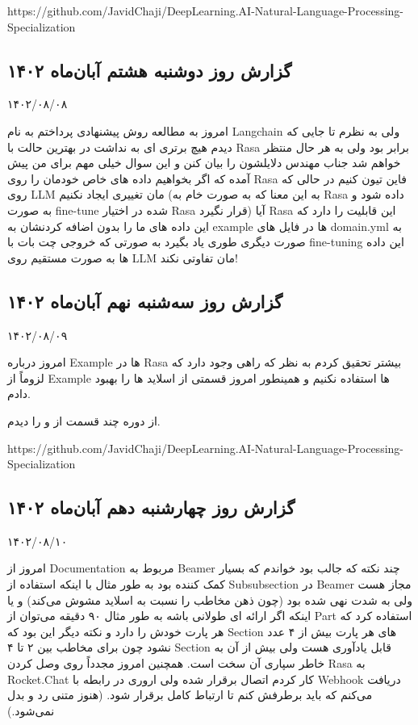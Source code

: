 https://github.com/JavidChaji/DeepLearning.AI-Natural-Language-Processing-Specialization


\subsection{گزارش روز دوشنبه هشتم آبان‌ماه ۱۴۰۲}

۱۴۰۲/۰۸/۰۸

امروز به مطالعه روش پیشنهادی پرداختم به نام Langchain ولی به نظرم تا جایی که دیدم هیچ برتری ای به   نداشت در بهترین حالت با Rasa برابر بود ولی به هر حال منتظر خواهم شد جناب مهندس دلایلشون را بیان کنن و این سوال خیلی مهم برای من پیش آمده که اگر بخواهیم داده های خاص خودمان را روی Rasa فاین تیون کنیم در حالی که روی LLM مان تغییری ایجاد نکنیم (به این معنا که به صورت خام به Rasa داده شود و به صورت fine-tune شده در اختیار Rasa قرار نگیرد) آیا Rasa این قابلیت را دارد که این داده های ما را بدون اضافه کردنشان به example ها در فایل های domain.yml به صورت دیگری طوری یاد بگیرد به صورتی که خروجی چت بات با fine-tuning این داده ها به صورت مستقیم روی LLM مان تفاوتی نکند!



\subsection{گزارش روز سه‌شنبه نهم آبان‌ماه ۱۴۰۲}

۱۴۰۲/۰۸/۰۹

امروز درباره Example ها در Rasa بیشتر تحقیق کردم به نظر که راهی وجود دارد که لزوماً از Example ها استفاده نکنیم و همینطور امروز قسمتی از اسلاید ها را بهبود دادم.

از دوره  چند قسمت از  و  را دیدم.

https://github.com/JavidChaji/DeepLearning.AI-Natural-Language-Processing-Specialization


\subsection{گزارش روز چهارشنبه دهم آبان‌ماه ۱۴۰۲}

۱۴۰۲/۰۸/۱۰

امروز از Documentation مربوط به Beamer چند نکته که جالب بود خواندم که بسیار کمک کننده بود به طور مثال با اینکه استفاده از Subsubsection در Beamer مجاز هست ولی به شدت نهی شده بود (چون ذهن مخاطب را نسبت به اسلاید مشوش می‌کند) و یا اینکه اگر ارائه ای طولانی باشه به طور مثال ۹۰ دقیقه می‌توان از Part استفاده کرد که هر پارت  خودش را دارد و نکته دیگر این بود که Section های هر پارت بیش از ۴ عدد نشود چون برای مخاطب بین ۲ تا ۴ Section قابل یادآوری هست ولی بیش از آن به خاطر سپاری آن سخت است. 
همچنین امروز مجدداً روی وصل کردن Rasa به Rocket.Chat کار کردم اتصال برقرار شده ولی اروری در رابطه با Webhook دریافت می‌کنم که باید برطرفش کنم تا ارتباط کامل برقرار شود. (هنوز متنی رد و بدل نمی‌شود.)




